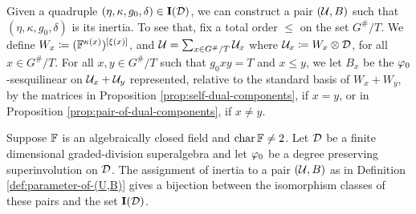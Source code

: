 Given a quadruple $(\eta, \kappa, g_0, \delta) \in \mathbf{I} (\mathcal{D})$, we can construct a pair $(\mathcal U, B)$ such that $(\eta, \kappa, g_0, \delta)$ is its inertia.
To see that, fix a total order $\leq$ on the set $G^\#/T$.
We define $W_x \coloneqq (\mathbb{F}^{\kappa(x)})^{[\xi(x)]}$, and $\mathcal U = \sum_{x \in G^\#/T} \mathcal U_x$ where $\mathcal U_x \coloneqq W_x \otimes \mathcal{D}$, for all $x\in G^\#/T$.
For all $x, y \in G^\#/T$ such that $g_0x y = T$ and $x \leq y$, we let $B_x$ be the $\varphi_0$-sesquilinear on $\mathcal U_x + \mathcal U_y$ represented, relative to the standard basis of $W_x + W_y$, by the matrices in Proposition \ref{prop:self-dual-components}, if $x=y$, or in Proposition \ref{prop:pair-of-dual-components}, if $x\neq y$.

\begin{thm}\label{thm:iso-(U,B)}
	Suppose $\mathbb{F}$ is an algebraically closed field and $\operatorname{char} \mathbb{F} \neq 2$. 
	Let $\mathcal{D}$ be a finite dimensional graded-division superalgebra and let $\varphi_0$ be a degree preserving superinvolution on $\mathcal{D}$. 
	The assignment of inertia to a pair $(\mathcal U, B)$ as in Definition \ref{def:parameter-of-(U,B)} gives a bijection between the isomorphism classes of these pairs and the set $\mathbf{I} (\mathcal{D})$. 
\end{thm}

